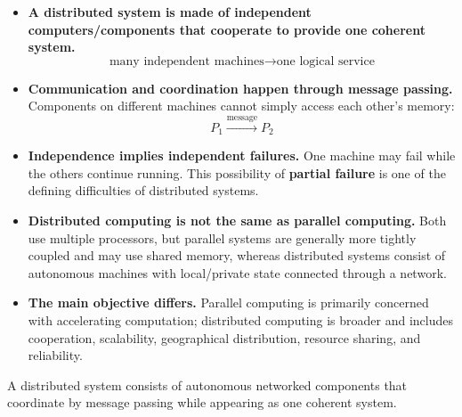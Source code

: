 \highspace
\begin{takeawaysbox}
    \begin{itemize}
        \item \textbf{A distributed system is made of independent computers/components that cooperate to provide one coherent system.}
            \begin{equation*}
                \boxed{\text{many independent machines} \rightarrow \text{one logical service}}
            \end{equation*}

        \item \textbf{Communication and coordination happen through message passing.} Components on different machines cannot simply access each other's memory:
            \begin{equation*}
                P_1 \xrightarrow{\text{message}} P_2
            \end{equation*}

        \item \textbf{Independence implies independent failures.} One machine may fail while the others continue running. This possibility of \textbf{partial failure} is one of the defining difficulties of distributed systems.

        \item \textbf{Distributed computing is not the same as parallel computing.} Both use multiple processors, but parallel systems are generally more tightly coupled and may use shared memory, whereas distributed systems consist of autonomous machines with local/private state connected through a network.

        \item \textbf{The main objective differs.} Parallel computing is primarily concerned with accelerating computation; distributed computing is broader and includes cooperation, scalability, geographical distribution, resource sharing, and reliability.
    \end{itemize}
    A distributed system consists of autonomous networked components that coordinate by message passing while appearing as one coherent system.
\end{takeawaysbox}
